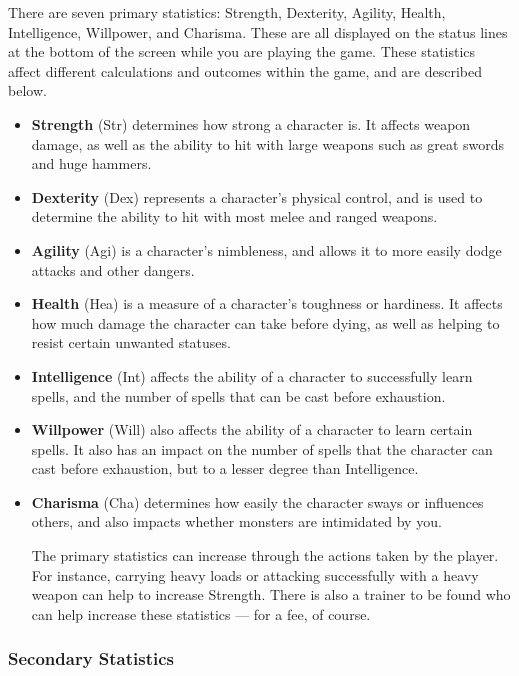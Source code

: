 There are seven primary statistics: Strength, Dexterity, Agility, Health,
Intelligence, Willpower, and Charisma.  These are all displayed on the
status lines at the bottom of the screen while you are playing the game.  
These statistics affect different calculations and outcomes within the 
game, and are described below.

\begin{itemize}
\item {\bf Strength} (Str) determines how strong a character is.  It 
affects weapon damage, as well as the ability to hit with large weapons 
such as great swords and huge hammers.

\item {\bf Dexterity} (Dex) represents a character's physical control, and 
is used to determine the ability to hit with most melee and ranged weapons.

\item {\bf Agility} (Agi) is a character's nimbleness, and allows it to 
more easily dodge attacks and other dangers.

\item {\bf Health} (Hea) is a measure of a character's toughness or 
hardiness.  It affects how much damage the character can take before dying,
as well as helping to resist certain unwanted statuses.

\item {\bf Intelligence} (Int) affects the ability of a character to 
successfully learn spells, and the number of spells that can be cast 
before exhaustion.

\item {\bf Willpower} (Will) also affects the ability of a character to 
learn certain spells.  It also has an impact on the number of spells that 
the character can cast before exhaustion, but to a lesser degree than
Intelligence.

\item {\bf Charisma} (Cha) determines how easily the character sways or
influences others, and also impacts whether monsters are intimidated by 
you.

The primary statistics can increase through the actions taken by the
player.  For instance, carrying heavy loads or attacking successfully with
a heavy weapon can help to increase Strength.  There is also a trainer
to be found who can help increase these statistics --- for a fee, of
course.

\end{itemize}
\subsubsection{Secondary Statistics}

